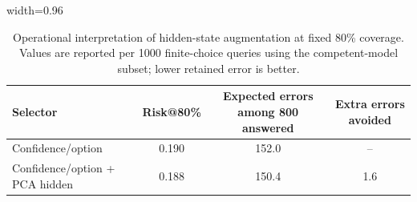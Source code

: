 \begin{table}[!htbp]
\centering
\small
\caption{Operational interpretation of hidden-state augmentation at fixed 80\% coverage. Values are reported per 1000 finite-choice queries using the competent-model subset; lower retained error is better.}
\label{tab:operational-interpretation}
\begin{adjustbox}{width=0.96\textwidth}
\begin{tabular}{lccc}
\toprule
Selector & Risk@80\% & Expected errors among 800 answered & Extra errors avoided \\
\midrule
Confidence/option & 0.190 & 152.0 & -- \\
Confidence/option + PCA hidden & 0.188 & 150.4 & 1.6 \\
\bottomrule
\end{tabular}
\end{adjustbox}
\end{table}
